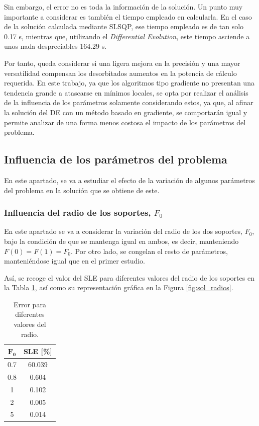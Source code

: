Sin embargo, el error no es toda la información de la solución. Un punto muy importante a considerar es también el tiempo empleado en calcularla. En el caso de la solución calculada mediante SLSQP, ese tiempo empleado es de tan solo 0.17 s, mientras que, utilizando el \textit{Differential Evolution}, este tiempo asciende a unos nada despreciables 164.29 s.

Por tanto, queda considerar si una ligera mejora en la precisión y una mayor versatilidad compensan los desorbitados aumentos en la potencia de cálculo requerida. En este trabajo, ya que los algoritmos tipo gradiente no presentan una tendencia grande a atascarse en mínimos locales, se opta por realizar el análisis de la influencia de los parámetros solamente considerando estos, ya que, al afinar la solución del DE con un método basado en gradiente, se comportarán igual y permite analizar de una forma menos costosa el impacto de los parámetros del problema. 

\subsection{Influencia de los parámetros del problema} \label{ap:infl_params}

En este apartado, se va a estudiar el efecto de la variación de algunos parámetros del problema en la solución que se obtiene de este.

\subsubsection{Influencia del radio de los soportes, $F_0$}

En este apartado se va a considerar la variación del radio de los dos soportes, $F_0$, bajo la condición de que se mantenga igual en ambos, es decir, manteniendo $F(0) = F(1) = F_0$. Por otro lado, se congelan el resto de parámetros, manteniéndose igual que en el primer estudio.

Así, se recoge el valor del SLE para diferentes valores del radio de los soportes en la Tabla \ref{tab:error_radio}, así como su representación gráfica en la Figura \ref{fig:sol_radios}. 

\begin{table}[h]
    \centering
    \caption{Error para diferentes valores del radio.}
    \begin{tabular}{c c}
    \hline
        $\mathbf{F_0}$ & \textbf{SLE [\%]} \\ \hline \hline
        0.7 & 60.039 \\ \hline
        0.8 &  0.604 \\ \hline
        1   &  0.102 \\ \hline
        2   &  0.005 \\ \hline
        5   &  0.014 \\ \hline
    \end{tabular}
    \label{tab:error_radio}
\end{table}

